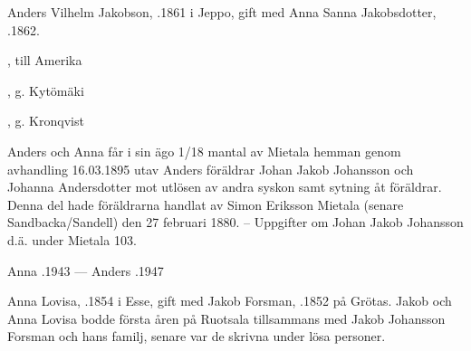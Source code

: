 Anders Vilhelm Jakobson, .1861 i Jeppo, gift med Anna Sanna Jakobsdotter, .1862.
\begin{jhchildren}
  \item {}, till Amerika
  \item {}
  \item {}
  \item {}
  \item {}
  \item {}
  \item {}
  \item {}, g. Kytömäki
  \item {}, g. Kronqvist
\end{jhchildren}

Anders och Anna får i sin ägo 1/18 mantal av Mietala hemman genom avhandling 16.03.1895 utav Anders föräldrar Johan Jakob Johansson och Johanna Andersdotter mot utlösen av andra syskon samt sytning åt föräldrar. Denna del hade föräldrarna handlat av Simon Eriksson Mietala (senare Sandbacka/Sandell) den 27 februari 1880. -- Uppgifter om Johan Jakob Johansson d.ä. under Mietala 103.

Anna .1943  ---  Anders .1947




Anna Lovisa, .1854 i Esse, gift med Jakob Forsman, .1852 på Grötas. Jakob och Anna Lovisa bodde första åren på Ruotsala tillsammans med Jakob Johansson Forsman och hans familj, senare var de skrivna under lösa personer.
\begin{jhchildren}
  \item {}
  \item {}
  \item {}
\end{jhchildren}

